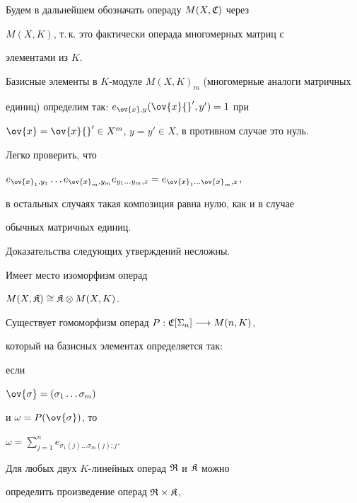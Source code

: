 Будем в дальнейшем обозначать операду $M(X,\frak C)$ через


$M(X, K)$, т.\,к. это фактически операда многомерных матриц с


элементами из $K$.


Базисные элементы в $K$-модуле $M(X,K)_m$ (многомерные аналоги матричных


единиц) определим так: $e_{\ov{x},y}(\ov{x}{}',y')=1$ при


$\ov{x}=\ov{x}{}'\in X^m$, $y=y'\in X$, в противном случае это нуль.


Легко проверить, что


$e_{\ov{x}_1,y_1} \dotsc e_{\ov{x}_m, y_m} e_{y_1\dots y_m, z}=


e_{\ov{x}_1\dots \ov{x}_m, z}$,


в остальных случаях такая композиция равна нулю, как и в случае


обычных матричных единиц.


Доказательства следующих утверждений несложны.





\begin{lem}


Имеет место изоморфизм операд


$M(X, \frak K)\cong \frak K \otimes M(X,K)$.


\end{lem}





\begin{lem}


Существует гомоморфизм операд $P:\frak C[\Sigma_n]\longrightarrow M(n,K)$,


который на базисных элементах определяется так$:$


если


$\ov{\sigma}=(\sigma_1\dotsc\sigma_m)$


и $\omega=P(\ov{\sigma})$, то


$\omega=\sum\limits_{j=1}^n  e_{\sigma_1(j)\dotsc \sigma_m(j); j}$.


\end{lem}





Для любых двух $K$-линейных операд $\frak R$ и $\frak K$ можно 


определить произведение операд $\frak R\times \frak K$,


